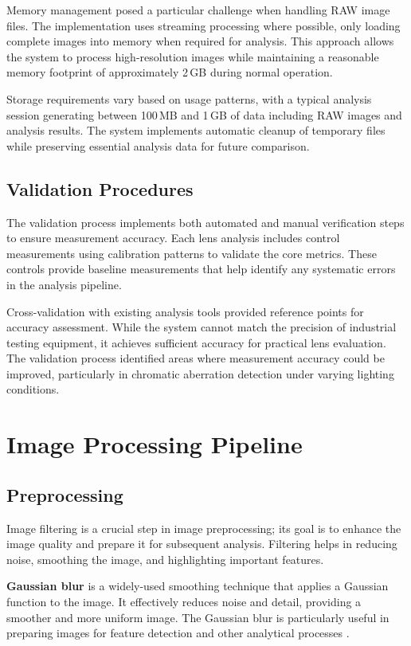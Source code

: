 Memory management posed a particular challenge when handling RAW image files. The implementation uses streaming processing where possible, only loading complete images into memory when required for analysis. This approach allows the system to process high-resolution images while maintaining a reasonable memory footprint of approximately 2\,GB during normal operation.

Storage requirements vary based on usage patterns, with a typical analysis session generating between 100\,MB and 1\,GB of data including RAW images and analysis results. The system implements automatic cleanup of temporary files while preserving essential analysis data for future comparison.

\subsection{Validation Procedures} 
The validation process implements both automated and manual verification steps to ensure measurement accuracy. Each lens analysis includes control measurements using calibration patterns to validate the core metrics. These controls provide baseline measurements that help identify any systematic errors in the analysis pipeline.

Cross-validation with existing analysis tools provided reference points for accuracy assessment. While the system cannot match the precision of industrial testing equipment, it achieves sufficient accuracy for practical lens evaluation. The validation process identified areas where measurement accuracy could be improved, particularly in chromatic aberration detection under varying lighting conditions.


\section{Image Processing Pipeline}

\subsection{Preprocessing}
Image filtering is a crucial step in image preprocessing; its goal is to enhance the image quality and prepare it for subsequent analysis. Filtering helps in reducing noise, smoothing the image, and highlighting important features.

\textbf{Gaussian blur} is a widely-used smoothing technique that applies a Gaussian function to the image. It effectively reduces noise and detail, providing a smoother and more uniform image. The Gaussian blur is particularly useful in preparing images for feature detection and other analytical processes \cite{gaussian}.

